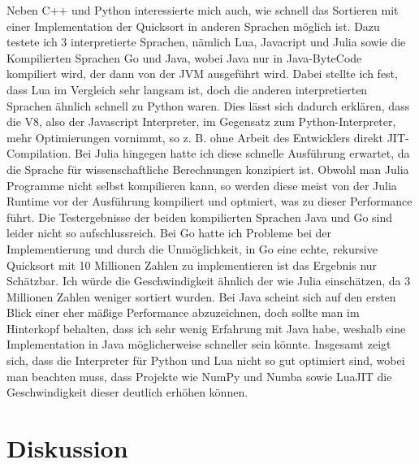 \documentclass[11pt,a4paper]{article}
\begin{document}
\clearpage

Neben C++ und Python interessierte mich auch, wie schnell das Sortieren mit einer Implementation der Quicksort 
in anderen Sprachen möglich ist. Dazu testete ich 3 interpretierte Sprachen, nämlich Lua, Javacript und Julia sowie die
Kompilierten Sprachen Go und Java, wobei Java nur in Java-ByteCode kompiliert wird, der dann von der JVM ausgeführt wird.
Dabei stellte ich fest, dass Lua im Vergleich sehr langsam ist, doch die anderen interpretierten Sprachen ähnlich schnell zu Python waren.
Dies lässt sich dadurch erklären, dass die V8, also der Javascript Interpreter, im Gegensatz zum Python-Interpreter,
mehr Optimierungen vornimmt, so z. B. ohne Arbeit des Entwicklers direkt JIT-Compilation. Bei Julia hingegen hatte ich diese
schnelle Ausführung erwartet, da die Sprache für wissenschaftliche Berechnungen konzipiert ist. Obwohl man Julia Programme nicht selbst kompilieren kann,
so werden diese meist von der Julia Runtime vor der Ausführung kompiliert und optmiert, was zu dieser Performance führt.
Die Testergebnisse der beiden kompilierten Sprachen Java und Go sind leider nicht so aufschlussreich.
Bei Go hatte ich Probleme bei der Implementierung und durch die Unmöglichkeit, in Go eine echte, rekursive Quicksort mit 10 Millionen Zahlen
zu implementieren ist das Ergebnis nur Schätzbar. Ich würde die Geschwindigkeit ähnlich der wie Julia einschätzen, da 3 Millionen Zahlen weniger sortiert wurden.
Bei Java scheint sich auf den ersten Blick einer eher mäßige Performance abzuzeichnen, doch sollte man im Hinterkopf behalten,
dass ich sehr wenig Erfahrung mit Java habe, weshalb eine Implementation in Java möglicherweise schneller sein könnte.
Insgesamt zeigt sich, dass die Interpreter für Python und Lua nicht so gut optimiert sind, wobei man beachten muss, dass Projekte wie NumPy und Numba sowie LuaJIT
die Geschwindigkeit dieser deutlich erhöhen können.

\clearpage

\section{Diskussion}
\end{document}
